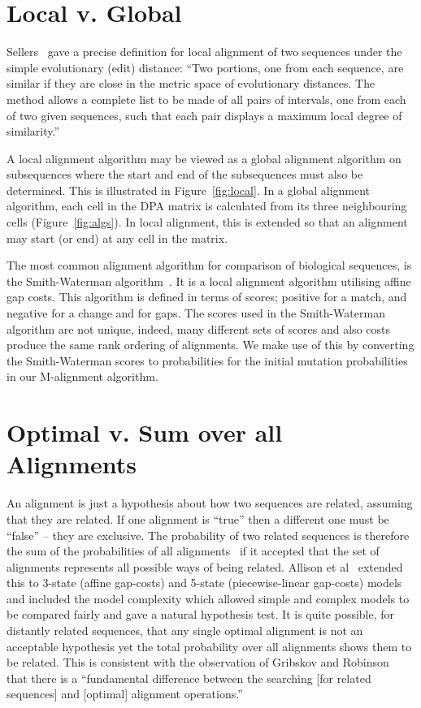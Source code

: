 \documentclass[letterpaper,11pt,oneside]{article}
\begin{document}
\section{Local v. Global}

Sellers~\cite{sellers80} gave a precise definition for local alignment
of two sequences under the simple evolutionary (edit) distance:
``Two portions, one from each sequence, are similar if they are close
in the metric space of evolutionary distances. The method allows
a complete list to be made of all pairs of intervals,
one from each of two given sequences, such that each pair
displays a maximum local degree of similarity.''

A local alignment algorithm may be viewed as a global alignment algorithm on
subsequences where the start and end of the subsequences must also be determined.
This is illustrated in Figure~\ref{fig:local}.  In a global alignment
algorithm, each cell in the DPA matrix is calculated from its three
neighbouring cells (Figure~\ref{fig:algs}). In local alignment, this is
extended so that an alignment may start (or end) at any cell in the matrix.

The most common alignment algorithm for comparison of biological sequences, is
the Smith-Waterman algorithm~\cite{smith81}.  It is a local alignment
algorithm utilising affine gap costs.  This algorithm is defined in terms of
scores; positive for a match, and negative for a change and for gaps.  The
scores used in the Smith-Waterman algorithm are not unique, indeed, many
different sets of scores and also costs produce the same rank ordering of
alignments.  We make use of this by converting the Smith-Waterman scores to
probabilities for the initial mutation probabilities in our M-alignment
algorithm.


\section{Optimal v. Sum over all Alignments}

An alignment is just a hypothesis about how two sequences are related,
assuming that they are related.  If one alignment is ``true'' then
a different one must be ``false'' -- they are exclusive.
The probability of two related sequences is therefore the sum of
the probabilities of all alignments~\cite{bishop86}
if it accepted that the set of alignments represents all
possible ways of being related.
Allison et al~\cite{allison92a} extended this to 3-state (affine gap-costs)
and 5-state (piecewise-linear gap-costs) models and included
the model complexity which allowed simple and complex
models to be compared fairly and gave a natural hypothesis test.
It is quite possible, for distantly related sequences, that any single
optimal alignment is not an acceptable hypothesis yet the total probability
over all alignments shows them to be related.
This is consistent with the observation of
Gribskov and Robinson~\cite{gribskov96} that there is
a ``fundamental difference between the searching [for related sequences]
and [optimal] alignment operations.''
\end{document}

